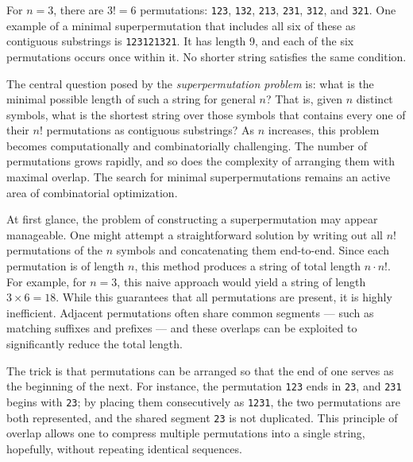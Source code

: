 For $n = 3$, there are $3! = 6$ permutations: \texttt{123}, \texttt{132}, \texttt{213}, \texttt{231}, \texttt{312}, and \texttt{321}. One example of a minimal superpermutation that includes all six of these as contiguous substrings is \texttt{123121321}. It has length 9, and each of the six permutations occurs once within it. No shorter string satisfies the same condition.

The central question posed by the \emph{superpermutation problem} is: what is the minimal possible length of such a string for general $n$? That is, given $n$ distinct symbols, what is the shortest string over those symbols that contains every one of their $n!$ permutations as contiguous substrings? As $n$ increases, this problem becomes computationally and combinatorially challenging. The number of permutations grows rapidly, and so does the complexity of arranging them with maximal overlap. The search for minimal superpermutations remains an active area of combinatorial optimization.

At first glance, the problem of constructing a superpermutation may appear manageable. One might attempt a straightforward solution by writing out all $n!$ permutations of the $n$ symbols and concatenating them end-to-end. Since each permutation is of length $n$, this method produces a string of total length $n \cdot n!$. For example, for $n = 3$, this naive approach would yield a string of length $3 \times 6 = 18$. While this guarantees that all permutations are present, it is highly inefficient. Adjacent permutations often share common segments — such as matching suffixes and prefixes — and these overlaps can be exploited to significantly reduce the total length.

The trick is that permutations can be arranged so that the end of one serves as the beginning of the next. For instance, the permutation \texttt{123} ends in \texttt{23}, and \texttt{231} begins with \texttt{23}; by placing them consecutively as \texttt{1231}, the two permutations are both represented, and the shared segment \texttt{23} is not duplicated. This principle of overlap allows one to compress multiple permutations into a single string, hopefully, without repeating identical sequences.

